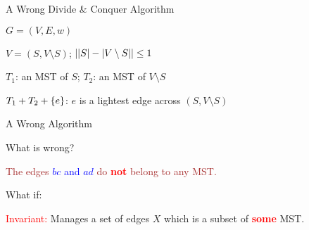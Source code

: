 \begin{frame}{A Wrong Divide \& Conquer Algorithm}
  \begin{description}
    \item[Input:] $G = (V, E, w)$
    \item[Divide:] $V = (S, V \setminus S)$; $\large| |S| - |V \setminus S| \large| \le 1$
    \item<2->[Conquer:] $T_1$: an MST of $S$; $T_2$: an MST of $V \setminus S$
    \item<3->[Combine:] $T_{1} + T_{2} + \{e\}$: $e$ is a lightest edge across $(S, V \setminus S)$
  \end{description}

  \pause
  \vspace{0.50cm}

\end{frame}
\begin{frame}{A Wrong Algorithm}
  \begin{alertblock}{What is wrong?}

	\centerline{\textcolor{brown}{The edges \textcolor{blue}{$bc$ and $ad$} do \textcolor{red}{\bf not} belong to any MST.}}
  \end{alertblock}

  \pause
  \vspace{0.50cm}

  \begin{alertblock}{What if:}
	\centerline{\textcolor{red}{Invariant:} Manages a set of edges $X$ which is a subset of \textcolor{red}{\bf some} MST.}
  \end{alertblock}
\end{frame}
